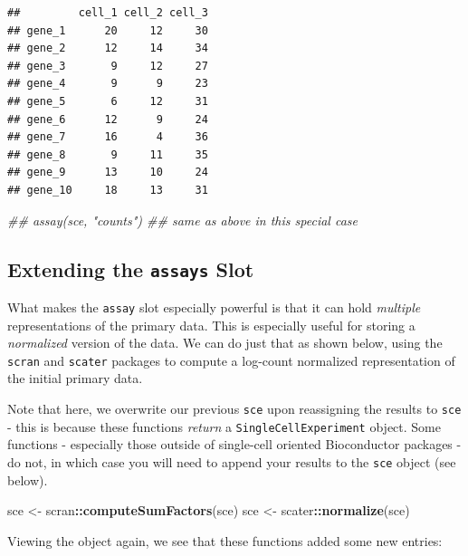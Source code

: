 \documentclass[]{book}
\newenvironment{Shaded}{\begin{snugshade}}{\end{snugshade}}
\newcommand{\CommentTok}[1]{\textcolor[rgb]{0.56,0.35,0.01}{\textit{#1}}}
\newcommand{\KeywordTok}[1]{\textcolor[rgb]{0.13,0.29,0.53}{\textbf{#1}}}
\newcommand{\NormalTok}[1]{#1}
\newcommand{\OperatorTok}[1]{\textcolor[rgb]{0.81,0.36,0.00}{\textbf{#1}}}
\newcommand{\StringTok}[1]{\textcolor[rgb]{0.31,0.60,0.02}{#1}}
\begin{document}
\begin{verbatim}
##         cell_1 cell_2 cell_3
## gene_1      20     12     30
## gene_2      12     14     34
## gene_3       9     12     27
## gene_4       9      9     23
## gene_5       6     12     31
## gene_6      12      9     24
## gene_7      16      4     36
## gene_8       9     11     35
## gene_9      13     10     24
## gene_10     18     13     31
\end{verbatim}

\begin{Shaded}
\begin{Highlighting}[]
\CommentTok{## assay(sce, "counts") ## same as above in this special case}
\end{Highlighting}
\end{Shaded}

\hypertarget{extending-the-assays-slot}{%
\subsection{\texorpdfstring{Extending the \texttt{assays} Slot}{Extending the assays Slot}}\label{extending-the-assays-slot}}

What makes the \texttt{assay} slot especially powerful is that it can hold \emph{multiple} representations of the primary data. This is especially useful for storing a \emph{normalized} version of the data. We can do just that as shown below, using the \texttt{scran} and \texttt{scater} packages to compute a log-count normalized representation of the initial primary data.

Note that here, we overwrite our previous \texttt{sce} upon reassigning the results to \texttt{sce} - this is because these functions \emph{return} a \texttt{SingleCellExperiment} object. Some functions - especially those outside of single-cell oriented Bioconductor packages - do not, in which case you will need to append your results to the \texttt{sce} object (see below).

\begin{Shaded}
\begin{Highlighting}[]
\NormalTok{sce <-}\StringTok{ }\NormalTok{scran}\OperatorTok{::}\KeywordTok{computeSumFactors}\NormalTok{(sce)}
\NormalTok{sce <-}\StringTok{ }\NormalTok{scater}\OperatorTok{::}\KeywordTok{normalize}\NormalTok{(sce)}
\end{Highlighting}
\end{Shaded}

Viewing the object again, we see that these functions added some new entries:
\end{document}
